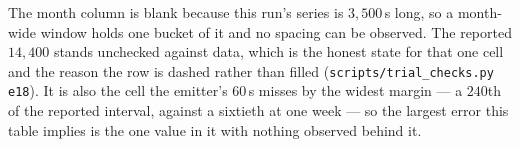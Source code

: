 \begin{remark}
The month column is blank because this run's series is $3{,}500$\,s long, so a
month-wide window holds one bucket of it and no spacing can be observed. The reported
$14{,}400$ stands unchecked against data, which is the honest state for that one cell
and the reason the row is dashed rather than filled
(\texttt{scripts\slash trial\_checks.py e18}). It is also the cell the emitter's
$60$\,s misses by the widest margin --- a $240$th of the reported interval, against a
sixtieth at one week --- so the largest error this table implies is the one value in it
with nothing observed behind it.
\end{remark}
